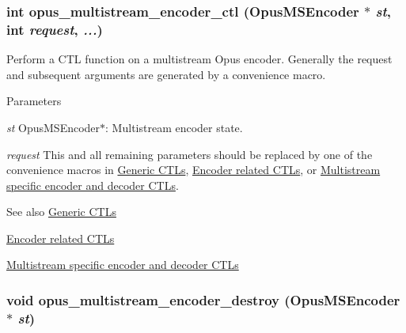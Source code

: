\hypertarget{group__opus__multistream_gae14328330c548dede66c494f51e33707}{
\subsubsection[{opus\_\-multistream\_\-encoder\_\-ctl}]{\setlength{\rightskip}{0pt plus 5cm}int opus\_\-multistream\_\-encoder\_\-ctl ({\bf OpusMSEncoder} $\ast$ {\em st}, \/  int {\em request}, \/   {\em ...})}}
\label{group__opus__multistream_gae14328330c548dede66c494f51e33707}


Perform a CTL function on a multistream Opus encoder. Generally the request and subsequent arguments are generated by a convenience macro. 
\begin{DoxyParams}{Parameters}
\item[{\em st}]{\ttfamily OpusMSEncoder$\ast$}: Multistream encoder state. \item[{\em request}]This and all remaining parameters should be replaced by one of the convenience macros in \hyperlink{group__opus__genericctls}{Generic CTLs}, \hyperlink{group__opus__encoderctls}{Encoder related CTLs}, or \hyperlink{group__opus__multistream__ctls}{Multistream specific encoder and decoder CTLs}. \end{DoxyParams}
\begin{DoxySeeAlso}{See also}
\hyperlink{group__opus__genericctls}{Generic CTLs} 

\hyperlink{group__opus__encoderctls}{Encoder related CTLs} 

\hyperlink{group__opus__multistream__ctls}{Multistream specific encoder and decoder CTLs} 
\end{DoxySeeAlso}
\hypertarget{group__opus__multistream_gaec819b8d4b38350aba6959cee7d33f94}{
\subsubsection[{opus\_\-multistream\_\-encoder\_\-destroy}]{\setlength{\rightskip}{0pt plus 5cm}void opus\_\-multistream\_\-encoder\_\-destroy ({\bf OpusMSEncoder} $\ast$ {\em st})}}
\label{group__opus__multistream_gaec819b8d4b38350aba6959cee7d33f94}


